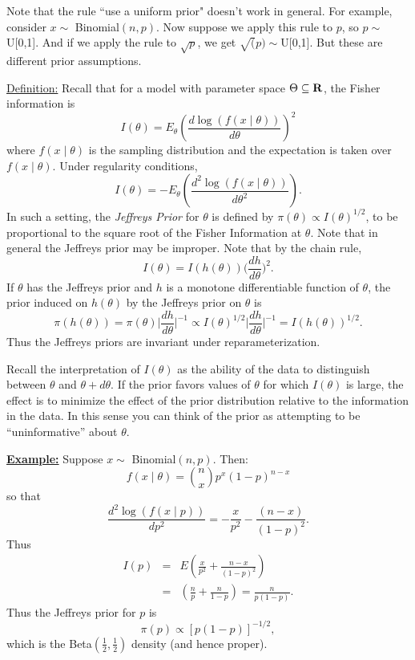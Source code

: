 \documentclass[12pt]{article}
\def\ni{\noindent}
\begin{document}
Note that the rule ``use a uniform prior" doesn't work in general. For example, consider $x\sim$ Binomial$(n,p)$.  Now suppose we apply this rule to $p$, so $p\sim$ U[0,1]. And if we apply the rule to $\sqrt{p}$, we get $\sqrt(p) \sim $U[0,1]. But these are different  prior assumptions.




\ni\underline{Definition:}  Recall that for a model with parameter space
$\Theta \subseteq \bf{R}$, the Fisher information is
$$I(\theta)=E_{\theta} \left(\frac{d\log(f(x\mid \theta))}{d\theta}
\right)^2$$
where $f(x\mid \theta)$ is the sampling distribution and the
expectation is taken over $f(x\mid \theta)$.  Under regularity
conditions,
$$I(\theta)=-E_{\theta} \left(\frac{d^2 \log(f(x\mid \theta))}{d\theta^2}
\right).$$
In such a setting, the {\it Jeffreys Prior} for $\theta$ is defined by
$\pi(\theta)\propto I(\theta)^{1/2}$, to be proportional to the square
root of the Fisher Information at $\theta$.  Note that in general the
Jeffreys prior may be improper.
\vskip 4mm
Note that by the chain rule,
$$I(\theta)=I(h(\theta)) \Big( \frac{dh}{d\theta} \Big)^2.$$
If $\theta$ has the Jeffreys prior and $h$ is a monotone differentiable
function of $\theta$, the prior induced on $h(\theta)$ by the Jeffreys
prior on $\theta$ is
$$\pi(h(\theta))=\pi(\theta) \big| \frac{dh}{d\theta} \big|^{-1}
\propto I(\theta)^{1/2} \big| \frac{dh}{d\theta}
\big|^{-1}=I(h(\theta))^{1/2}.$$
Thus the Jeffreys priors are invariant under reparameterization.

Recall the interpretation of $I(\theta)$ as the ability of the data to
distinguish between $\theta$ and $\theta+d\theta$.  If the prior
favors values of $\theta$ for which $I(\theta)$ is large, the effect
is to minimize the effect of the prior distribution relative to the
information in the data. In this sense you can 
think of the prior as attempting to be ``uninformative'' about
$\theta$.

\vskip 6mm
\ni\underline{\bf Example:}
\vskip 4mm
Suppose $x\sim$ Binomial$(n,p)$.  Then:
$$f(x\mid \theta)={n \choose x}p^x (1-p)^{n-x}$$
so that
$$\frac{d^2 \log(f(x\mid p))}{dp^2}
=-\frac{x}{p^2} - \frac{(n-x)}{(1-p)^2}.$$
Thus
\begin{eqnarray*}
I(p)&=&E\left( \frac{x}{p^2} + \frac{n-x}{(1-p)^2} \right)\\
&=&\left( \frac{n}{p} + \frac{n}{1-p} \right) = \frac{n}{p(1-p)}.
\end{eqnarray*}
Thus the Jeffreys prior for $p$ is
$$\pi(p)\propto [p(1-p)]^{-1/2},
$$
which is the Beta$(\frac{1}{2},\frac{1}{2})$ density (and hence proper).
\vskip 8mm
\end{document}
